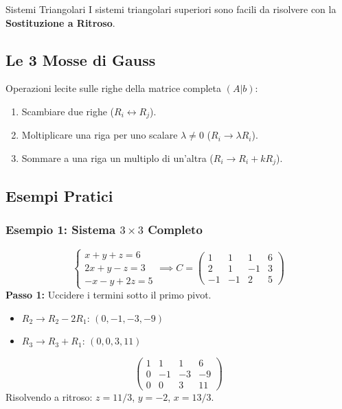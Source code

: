 \begin{concept}{Sistemi Triangolari}
I sistemi triangolari superiori sono facili da risolvere con la \textbf{Sostituzione a Ritroso}.
\end{concept}

\subsection{Le 3 Mosse di Gauss}
Operazioni lecite sulle righe della matrice completa $(A|b)$:
\begin{enumerate}
    \item[(I)] Scambiare due righe ($R_i \leftrightarrow R_j$).
    \item[(II)] Moltiplicare una riga per uno scalare $\lambda \neq 0$ ($R_i \to \lambda R_i$).
    \item[(III)] Sommare a una riga un multiplo di un'altra ($R_i \to R_i + k R_j$).
\end{enumerate}

\subsection{Esempi Pratici}

\subsubsection{Esempio 1: Sistema $3 \times 3$ Completo}
$$ \begin{cases} x+y+z=6 \\ 2x+y-z=3 \\ -x-y+2z=5 \end{cases} \implies C = \left(\begin{array}{ccc|c} 1 & 1 & 1 & 6 \\ 2 & 1 & -1 & 3 \\ -1 & -1 & 2 & 5 \end{array}\right) $$
\textbf{Passo 1:} Uccidere i termini sotto il primo pivot.
\begin{itemize}
    \item $R_2 \to R_2 - 2R_1$: $(0, -1, -3, -9)$
    \item $R_3 \to R_3 + R_1$: $(0, 0, 3, 11)$
\end{itemize}
$$ \left(\begin{array}{ccc|c}  1 & 1 & 1 & 6 \\  0 & -1 & -3 & -9 \\  0 & 0 & 3 & 11  \end{array}\right) $$
Risolvendo a ritroso: $z = 11/3$, $y = -2$, $x = 13/3$.

